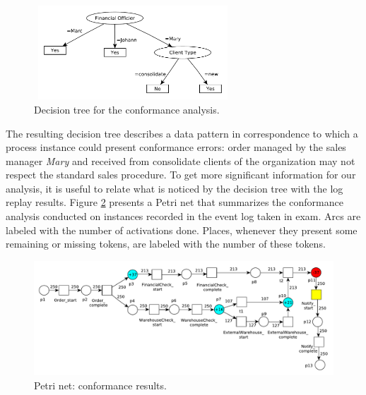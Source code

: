 \documentclass{llncs}
\begin{document}
\begin{figure}[h]
\centering
\includegraphics[width=210pt,height=100pt]
{./items/Sales_tree.pdf}
\caption{Decision tree for the conformance analysis.}
\label{salesDecTree}
\end{figure}
The resulting decision tree describes a data pattern in correspondence to which a process instance could present conformance errors: order managed by the sales manager \emph{Mary} and received from consolidate clients of the organization may not respect the standard sales procedure. To get more significant information for our analysis, it is useful to relate what is noticed by the decision tree with the log replay results. Figure \ref{replayResult} presents a Petri net that summarizes the conformance analysis conducted on instances recorded in the event log taken in exam. Arcs are labeled with the number of activations done. Places, whenever they present some remaining or missing tokens, are labeled with the number of these tokens.
\begin{figure}[h]
\includegraphics[width=360pt]
{./items/Sales_PN_resultMod.pdf}
\caption{Petri net: conformance results.}
\label{replayResult}
\end{figure}
\end{document}
